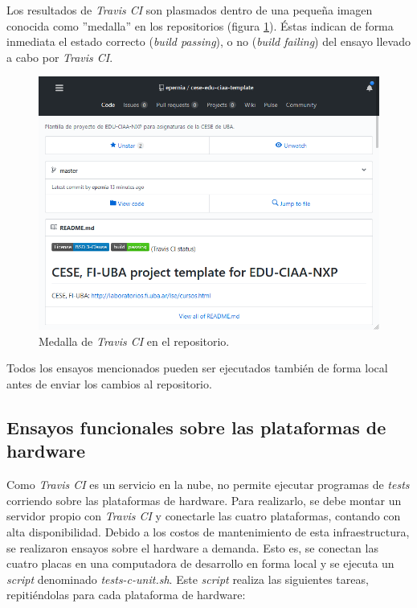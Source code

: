 Los resultados de \emph{Travis CI} son plasmados dentro de una pequeña imagen conocida como ''medalla'' en los repositorios (figura \ref{fig:travisBadge}). Éstas indican de forma inmediata el estado correcto (\emph{build passing}), o no (\emph{build failing}) del ensayo llevado a cabo por \emph{Travis CI}. 

\begin{figure}[!htbp]
\begin{center}  %
\includegraphics*[width=14cm]{Figures/travisBadge.png}
\par\caption{Medalla de \emph{Travis CI} en el repositorio.}\label{fig:travisBadge}
\end{center}
\end{figure}

Todos los ensayos mencionados pueden ser ejecutados también de forma local antes de enviar los cambios al repositorio.

\subsection{Ensayos funcionales sobre las plataformas de hardware}

Como \emph{Travis CI} es un servicio en la nube, no permite ejecutar programas de \emph{tests} corriendo sobre las plataformas de hardware. Para realizarlo, se debe montar un servidor propio con \emph{Travis CI} y conectarle las cuatro plataformas, contando con alta disponibilidad. Debido a los costos de mantenimiento de esta infraestructura, se realizaron ensayos sobre el hardware a demanda. Esto es, se conectan las cuatro placas en una computadora de desarrollo en forma local y se ejecuta un \emph{script} denominado \emph{tests-c-unit.sh}. Este \emph{script} realiza las siguientes tareas, repitiéndolas para cada plataforma de hardware:

